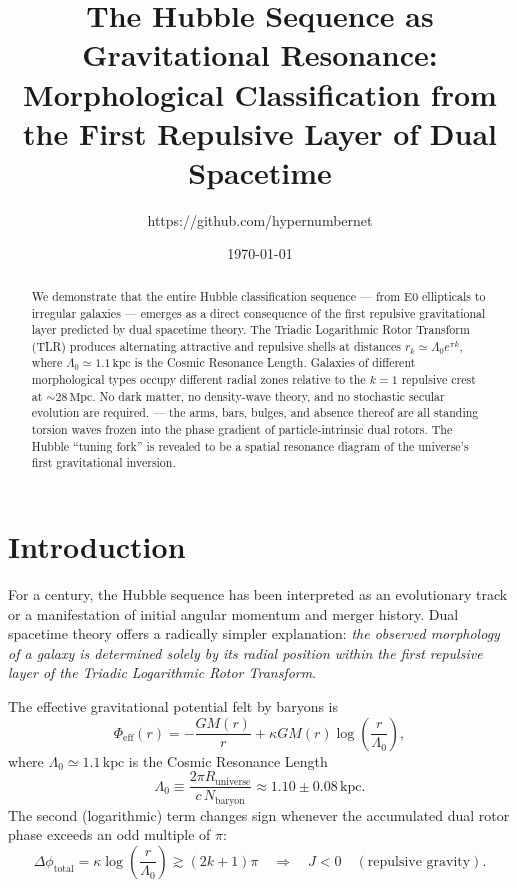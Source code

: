 \documentclass[dvipdfmx,11pt,a4paper]{article}
\title{The Hubble Sequence as Gravitational Resonance:\\Morphological Classification from the First Repulsive Layer of Dual Spacetime}
\author{https://github.com/hypernumbernet}
\date{\today}
\begin{document}
\maketitle

\begin{abstract}
We demonstrate that the entire Hubble classification sequence --- from E0 ellipticals to irregular galaxies --- emerges as a direct consequence of the first repulsive gravitational layer predicted by dual spacetime theory.  
The Triadic Logarithmic Rotor Transform (TLR) produces alternating attractive and repulsive shells at distances $r_k \simeq \Lambda_0 e^{\pi k}$, where $\Lambda_0 \simeq 1.1\,\mathrm{kpc}$ is the Cosmic Resonance Length.  
Galaxies of different morphological types occupy different radial zones relative to the $k=1$ repulsive crest at $\sim 28\,\mathrm{Mpc}$.  
No dark matter, no density-wave theory, and no stochastic secular evolution are required.  
--- the arms, bars, bulges, and absence thereof are all standing torsion waves frozen into the phase gradient of particle-intrinsic dual rotors.  
The Hubble ``tuning fork'' is revealed to be a spatial resonance diagram of the universe's first gravitational inversion.
\end{abstract}

\section{Introduction}

For a century, the Hubble sequence has been interpreted as an evolutionary track or a manifestation of initial angular momentum and merger history.  
Dual spacetime theory \cite{Hypernumbernet2025} offers a radically simpler explanation:  
\emph{the observed morphology of a galaxy is determined solely by its radial position within the first repulsive layer of the Triadic Logarithmic Rotor Transform}.

The effective gravitational potential felt by baryons is
\begin{equation}
\Phi_\text{eff}(r) = -\frac{GM(r)}{r} + \kappa G M(r) \log\!\left(\frac{r}{\Lambda_0}\right),
\label{eq:phi}
\end{equation}
where $\Lambda_0 \simeq 1.1\,\mathrm{kpc}$ is the Cosmic Resonance Length
\begin{equation}
\boxed{\Lambda_0 \equiv \frac{2\pi R_\text{universe}}{c\,N_\text{baryon}} \approx 1.10\pm0.08\,\mathrm{kpc}.}
\end{equation}
The second (logarithmic) term changes sign whenever the accumulated dual rotor phase exceeds an odd multiple of $\pi$:
\begin{equation}
\Delta\phi_\text{total} = \kappa \log\!\left(\frac{r}{\Lambda_0}\right) \gtrsim (2k+1)\pi \quad \Rightarrow \quad J < 0 \quad (\text{repulsive gravity}).
\end{equation}
\end{document}
